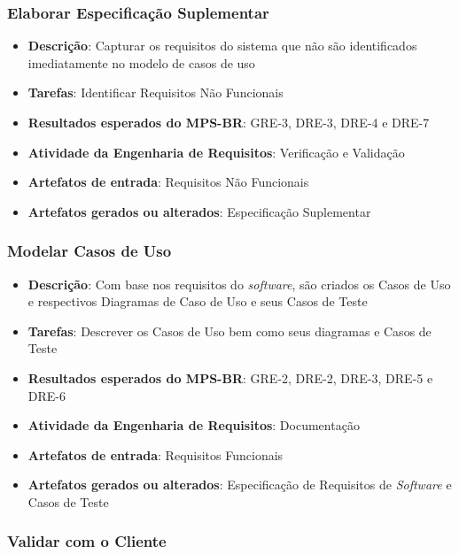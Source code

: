 \subsubsection{Elaborar Especificação Suplementar}

\begin{itemize}
\item \textbf{Descrição}: Capturar os requisitos do sistema que não são identificados imediatamente no modelo de casos de uso
\item \textbf{Tarefas}: Identificar Requisitos Não Funcionais
\item \textbf{Resultados esperados do MPS-BR}: GRE-3, DRE-3, DRE-4 e DRE-7
\item \textbf{Atividade da Engenharia de Requisitos}: Verificação e Validação
\item \textbf{Artefatos de entrada}: Requisitos Não Funcionais
\item \textbf{Artefatos gerados ou alterados}: Especificação Suplementar
\end{itemize}

\subsubsection{Modelar Casos de Uso}

\begin{itemize}
\item \textbf{Descrição}: Com base nos requisitos do \textit{software}, são criados os Casos de Uso e respectivos Diagramas de Caso de Uso e seus Casos de Teste
\item \textbf{Tarefas}: Descrever os Casos de Uso bem como seus diagramas e Casos de Teste
\item \textbf{Resultados esperados do MPS-BR}: GRE-2, DRE-2, DRE-3, DRE-5 e DRE-6
\item \textbf{Atividade da Engenharia de Requisitos}: Documentação
\item \textbf{Artefatos de entrada}: Requisitos Funcionais
\item \textbf{Artefatos gerados ou alterados}: Especificação de Requisitos de \textit{Software} e Casos de Teste
\end{itemize}

\subsubsection{Validar com o Cliente}


